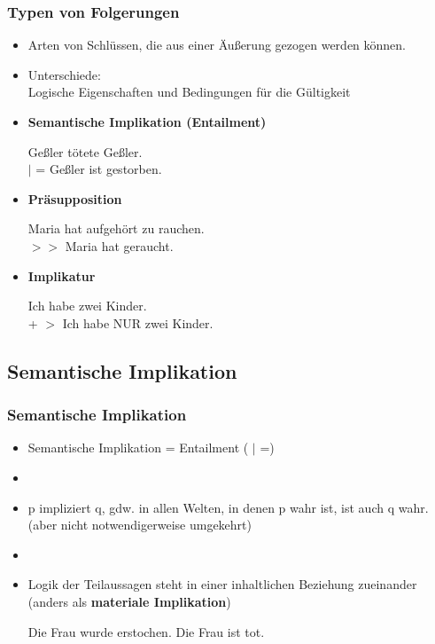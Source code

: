 \begin{frame}
\frametitle{Typen von Folgerungen}

\begin{itemize}
	\item Arten von Schlüssen, die aus einer Äu\ss{}erung gezogen werden können.
	\item Unterschiede:\\
Logische Eigenschaften und Bedingungen für die Gültigkeit

\vspace{1ex}
	\item \textbf{Semantische Implikation (Entailment)}
	
	\ea Ge\ss{}ler tötete Ge\ss{}ler.\\ $|$ = Ge\ss{}ler ist gestorben.
	\z
	
	\item \textbf{Präsupposition}
	
	\ea Maria hat aufgehört zu rauchen.\\ $>>$ Maria hat geraucht.
	\z

	\item \textbf{Implikatur}
	
	\ea Ich habe zwei Kinder.\\ + $>$ Ich habe NUR zwei Kinder.
	\z

\end{itemize}

\end{frame}


%
\subsection{Semantische Implikation}
%

\begin{frame}
\frametitle{Semantische Implikation}

\begin{itemize}
	\item Semantische Implikation  = Entailment ( $|$ =)
	\item []
	\item p impliziert q, gdw. in allen Welten, in denen p wahr ist, ist auch q wahr. (aber nicht notwendigerweise umgekehrt)
	\item[]
	\item Logik der Teilaussagen steht in einer inhaltlichen Beziehung zueinander (anders als \textbf{materiale Implikation})

	\eal
		\ex Die Frau wurde erstochen.
		\ex Die Frau ist tot.
	\zl

\end{itemize}

\end{frame}


